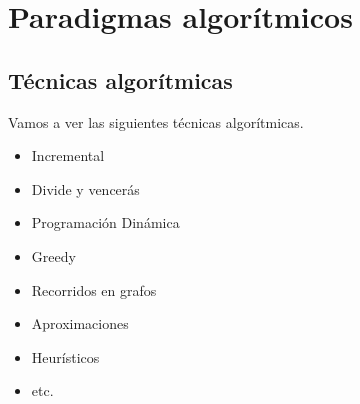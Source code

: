 \documentclass[AL.tex]{subfiles}
\begin{document}

\chapter{Paradigmas algorítmicos}
\section{Técnicas algorítmicas}
Vamos a ver las siguientes técnicas algorítmicas.
\begin{itemize}
\item Incremental
\item Divide y vencerás
\item Programación Dinámica
\item Greedy
\item Recorridos en grafos
\item Aproximaciones
\item Heurísticos
\item etc.
\end{itemize}
\end{document}
